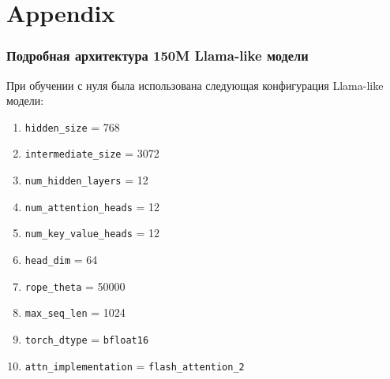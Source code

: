 \chapter*{Appendix}

\subsection{Подробная архитектура 150M Llama-like модели}\label{app:architecture_150m_llama}

При обучении с нуля была использована следующая конфигурация Llama-like модели:
\begin{enumerate}
    \item \texttt{hidden\_size} = 768
    \item \texttt{intermediate\_size} = 3072
    \item \texttt{num\_hidden\_layers} = 12
    \item \texttt{num\_attention\_heads} = 12
    \item \texttt{num\_key\_value\_heads} = 12
    \item \texttt{head\_dim} = 64
    \item \texttt{rope\_theta} = 50000
    \item \texttt{max\_seq\_len} = 1024
    \item \texttt{torch\_dtype} = \texttt{bfloat16}
    \item \texttt{attn\_implementation} = \texttt{flash\_attention\_2}
\end{enumerate}


